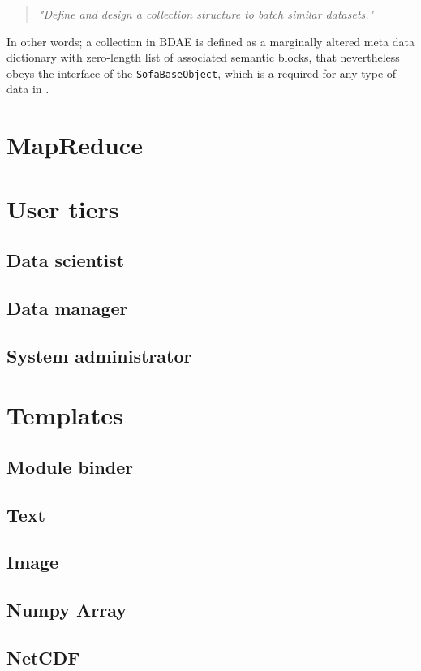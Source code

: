 \begin{quotation}
	\textit{"Define and design a collection structure to batch similar datasets."}
\end{quotation}

In other words; a collection in BDAE is defined as a marginally altered meta data dictionary with zero-length list of associated semantic blocks, that nevertheless obeys the interface of the \texttt{SofaBaseObject}, which is a required for any type of data in \CodeName.

\section{MapReduce}

\section{User tiers}
\subsection{Data scientist}
\subsection{Data manager}
\subsection{System administrator}

\section{Templates}
\subsection{Module binder}
\subsection{Text}
\subsection{Image}
\subsection{Numpy Array}
\subsection{NetCDF}

